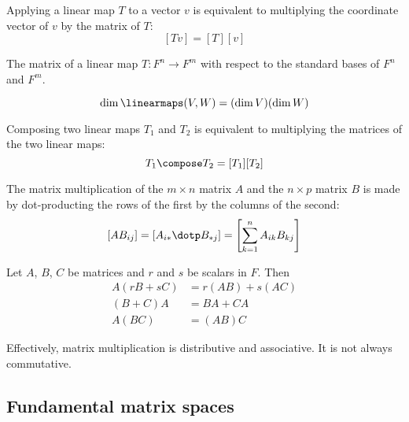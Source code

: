 \begin{lemma}
  Applying a linear map $T$ to a vector $v$ is equivalent to multiplying the coordinate vector of $v$ by the matrix of $T$:
  \[
    [Tv] = [T][v]
  \]
\end{lemma}

\begin{definition}
  The matrix of a linear map $T : F^n \to F^m$ with respect to the standard bases of $F^n$ and $F^m$.
\end{definition}

\begin{lemma}
  \[
    \dim \linearmaps(V, W) = (\dim V) (\dim W)
  \]
\end{lemma}

\begin{lemma}
  Composing two linear maps $T_1$ and $T_2$ is equivalent to multiplying the matrices of the two linear maps:
  \[
    T_1 \compose T_2 = [T_1] [T_2]
  \]
\end{lemma}

\begin{definition}
  The matrix multiplication of  the $m \times n$ matrix $A$ and the $n \times p$ matrix $B$ is made by dot-producting the rows of the first by the columns of the second:
  \[
    \left[AB_{ij}\right] = \left[A_{i*} \dotp B_{*j}\right] = \left[\sum_{k=1}^n A_{ik} B_{kj} \right]
  \]
\end{definition}

\begin{theorem}
  Let $A$, $B$, $C$ be matrices and $r$ and $s$ be scalars in $F$. Then
  \begin{align*}
      A\left( rB+sC\right) &= r\left( AB\right) +s\left( AC\right) \\
      \left( B+C\right) A &=BA+CA \\
      A\left( BC\right) &=\left( AB\right) C
  \end{align*}

  Effectively, matrix multiplication is distributive and associative. It is not always commutative.
\end{theorem}

\subsection{Fundamental matrix spaces}

